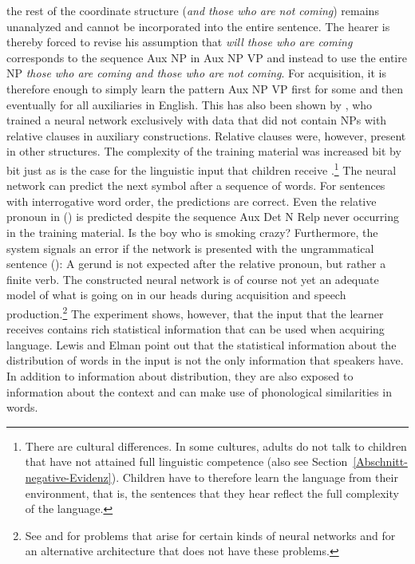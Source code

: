 the rest of the coordinate structure (\emph{and those who are not coming}) remains unanalyzed and cannot be incorporated into the entire sentence.
The hearer is thereby forced to revise his assumption that \emph{will those who are coming} corresponds to the sequence Aux NP in Aux NP VP and instead to
use the entire NP \emph{those who are coming and those who are not coming}.
For acquisition, it is therefore enough to simply learn the pattern Aux NP VP first for some and then eventually for all auxiliaries in English.
This has also been shown by \citet{LE2001a}, who trained a neural network exclusively with data that did not contain NPs with relative
clauses in auxiliary constructions. Relative clauses were, however, present in other structures. The complexity of the training material was increased bit
by bit just as is the case for the linguistic input that children receive
\citep{Elman93a}.\footnote{
	There are cultural differences. In some cultures, adults do not talk to children that have not attained
	full linguistic competence \citep{Ochs82a,OS84a} (also see
  Section~\ref{Abschnitt-negative-Evidenz}). Children have to therefore learn the language from their environment, that is, the sentences that
  they hear reflect the full complexity of the language.
} The neural network can predict the next symbol after a sequence of words. For sentences with interrogative word order, the predictions are correct.
Even the relative pronoun in () is predicted despite the sequence Aux Det N Relp never occurring in the training material.
\ea
Is the boy who is smoking crazy?
\z
Furthermore, the system signals an error if the network is presented with the ungrammatical sentence ():
\z
A gerund is not expected after the relative pronoun, but rather a finite verb. The constructed neural network is of course not yet an adequate model of what is
going on in our heads during acquisition and speech production.\footnote{
  See \citet[]{Hurford2002a} and \citet[Section~6.2]{Jackendoff2007a} for problems that arise for certain kinds of neural
  networks and \citet{Pulvermueller2003a,Pulvermueller2010a} for an alternative
  architecture that does not have these problems.
} The experiment shows, however, that the input that the learner receives contains rich statistical information that can be
used when acquiring language. Lewis and Elman point out that the statistical information about the distribution of words in the input
is not the only information that speakers have. In addition to information about distribution, they are also exposed to information about the context
and can make use of phonological similarities in words.

